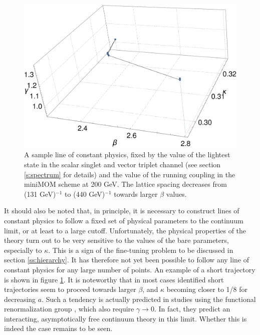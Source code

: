 \documentclass[final,12pt]{article}
\newcommand*{\1}{1\!\!\!\bot}
\begin{document}
\begin{figure}[!htbp]
\begin{minipage}{0.7\linewidth}
\includegraphics[width=\linewidth]{lcp-example}
\end{minipage}
\begin{minipage}{0.3\linewidth}
\caption{\label{fig:lcpex}A sample line of constant physics, fixed by the value of the lightest state in the scalar singlet and vector triplet channel (see section \ref{s:spectrum} for details) and the value of the running coupling in the miniMOM scheme at 200 GeV. The lattice spacing decreases from (131 GeV)$^{-1}$ to (440 GeV)$^{-1}$ towards larger $\beta$ values.}
\end{minipage}
\end{figure}

It should also be noted that, in principle, it is necessary to construct lines of constant physics \cite{Montvay:1994cy,Gattringer:2010zz,DeGrand:2006zz} to follow a fixed set of physical parameters to the continuum limit, or at least to a large cutoff. Unfortunately, the physical properties of the theory turn out to be very sensitive to the values of the bare parameters, especially to $\kappa$. This is a sign of the fine-tuning problem to be discussed in section \ref{ss:hierarchy}. It has therefore not yet been possible to follow any line of constant physics for any large number of points. An example of a short trajectory is shown in figure \ref{fig:lcpex}. It is noteworthy that in most cases identified short trajectories seem to proceed towards larger $\beta$, and $\kappa$ becoming closer to 1/8 for decreasing $a$. Such a tendency is actually predicted in studies using the functional renormalization group \cite{Gies:2015lia,Gies:2016kkk}, which also require $\gamma\to 0$. In fact, they predict an interacting, asymptotically free continuum theory in this limit. Whether this is indeed the case remains to be seen.
\end{document}

